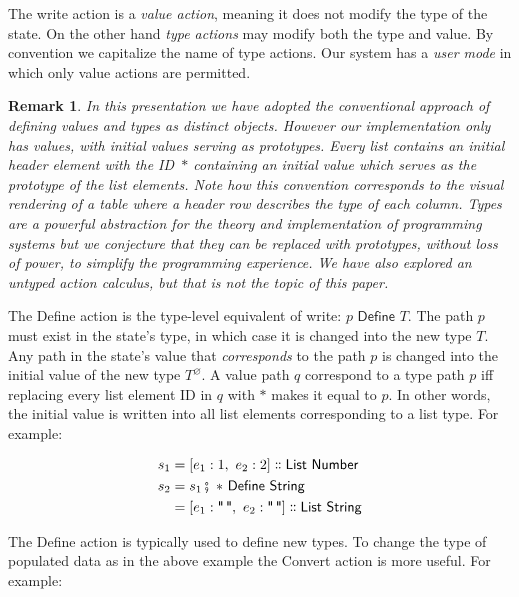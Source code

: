 \documentclass[english,submission]{programming}
\newtheorem*{remark}{Remark}
\newcommand{\mathbox}[1]{\colorbox{black!10}{$#1$}}
\DeclareMathOperator{\exec}{\fatsemi\ }
\newcommand{\isa}{\dblcolon}
\newcommand{\emptystring}{\textsf{\textquotedbl\ \!\textquotedbl}}
\begin{document}
The \textsf{write} action is a \textit{value action}, meaning it does not modify the type of the state. On the other hand \textit{type actions} may modify both the type and value. By convention we capitalize the name of type actions. Our system has a \textit{user mode} in which only value actions are permitted.

\begin{remark}\normalfont
In this presentation we have adopted the conventional approach of defining values and types as distinct objects. However our implementation only has values, with initial values serving as prototypes. Every list contains an initial \textit{header} element with the ID~\mathbox{*} containing an initial value which serves as the prototype of the list elements. Note how this convention corresponds to the visual rendering of a table where a header row describes the type of each column. Types are a powerful abstraction for the theory and implementation of programming systems but we conjecture that they can be replaced with prototypes, without loss of power, to simplify the programming experience. We have also explored an untyped action calculus\cite{denicek}, but that is not the topic of this paper.
\end{remark}

The \textsf{Define} action is the type-level equivalent of \textsf{write}: \mathbox{p \textsf{ Define } T}. The path $p$ must exist in the state's type, in which case it is changed into the new type $T$. Any path in the state's value that \textit{corresponds} to the path $p$ is changed into the initial value of the new type $T^\varnothing$. A value path $q$ correspond to a type path $p$ iff replacing every list element ID in $q$ with $*$ makes it equal to $p$. In other words, the initial value is written into all list elements corresponding to a list type. For example:


\begin{align*}
s_1 &= [ e_1: 1,\  e_2: 2] \isa \textsf{List Number}\\
s_2 &= s_1 \exec * \textsf{ Define } \textsf{String}\\
    &= [ e_1: \emptystring,\  e_2: \emptystring] \isa \textsf{List String}\\
\end{align*}

The \textsf{Define} action is typically used to define new types. To change the type of populated data as in the above example the \textsf{Convert} action is more useful. For example:
\end{document}
